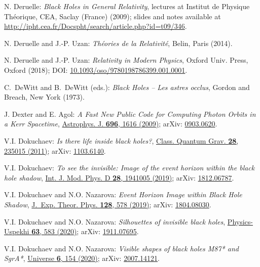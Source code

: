 \begin{thebibliography}{123}
N. Deruelle: {\em Black Holes in General Relativity}, lectures at
Institut de Physique Théorique, CEA, Saclay (France) (2009); slides and notes
available at
\url{http://ipht.cea.fr/Docspht/search/article.php?id=t09/346}.

N. Deruelle and J.-P. Uzan: {\em Th\'eories de la Relativit\'e},
Belin, Paris (2014).

N. Deruelle and J.-P. Uzan: {\em Relativity in Modern Physics},
Oxford Univ. Press, Oxford (2018);
DOI: \href{https://doi.org/10.1093/oso/9780198786399.001.0001}{10.1093/oso/9780198786399.001.0001}.

C.~DeWitt and B.~DeWitt (eds.):
{\em Black Holes -- Les astres occlus},
Gordon and Breach, New York (1973).

J. Dexter and E. Agol:
{\em A Fast New Public Code for Computing Photon Orbits in a Kerr Spacetime},
\href{https://doi.org/10.1088/0004-637X/696/2/1616}{Astrophys. J. {\bf 696}, 1616 (2009)};
arXiv: \href{https://arxiv.org/abs/0903.0620}{0903.0620}.

V.I. Dokuchaev: {\em Is there life inside black holes?},
\href{https://doi.org/10.1088/0264-9381/28/23/235015}{Class. Quantum Grav. {\bf 28}, 235015 (2011)};
arXiv: \href{https://arxiv.org/abs/1103.6140}{1103.6140}.

V.I. Dokuchaev: {\em To see the invisible: Image of the event horizon within the black hole shadow},
\href{https://doi.org/10.1142/S0218271819410050}{Int. J. Mod. Phys. D {\bf 28}, 1941005 (2019)};
arXiv: \href{https://arxiv.org/abs/1812.06787}{1812.06787}.

V.I. Dokuchaev and N.O. Nazarova: {\em Event Horizon Image within Black Hole Shadow},
\href{https://doi.org/10.1134/S1063776119030026}{J.~Exp. Theor. Phys. {\bf 128}, 578 (2019)};
arXiv: \href{https://arxiv.org/abs/1804.08030}{1804.08030}.

V.I. Dokuchaev and N.O. Nazarova: {\em Silhouettes of invisible black holes},
\href{https://doi.org/10.3367/UFNe.2020.01.038717}{Physics-Uspekhi {\bf 63}, 583 (2020)};
arXiv: \href{https://arxiv.org/abs/1911.07695}{1911.07695}.

V.I. Dokuchaev and N.O. Nazarova: {\em Visible shapes of black holes M87* and SgrA*},
\href{https://doi.org/10.3390/universe6090154}{Universe {\bf 6}, 154 (2020)};
arXiv: \href{https://arxiv.org/abs/2007.14121}{2007.14121}.


\end{thebibliography}
